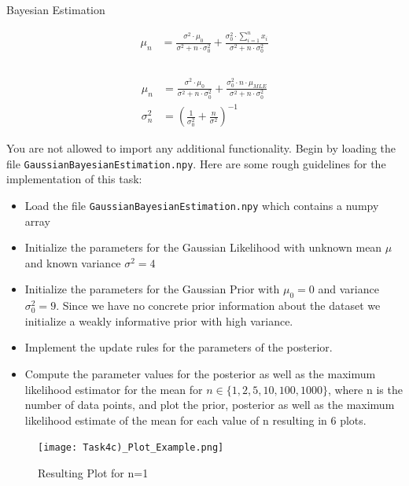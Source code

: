 \documentclass[
	english,
        solution=true
	]{tudaexercise}
\begin{document}
\begin{task}[points=16]{Bayesian Estimation}
\begin{subtask}[points=12]
    \begin{align}
        \mu_{n} &= \frac{\sigma^{2} \cdot \mu_{0}}{\sigma^{2}+n\cdot\sigma_{0}^{2}} + \frac{\sigma_{0}^{2}\cdot \sum_{i=1}^{n} x_i}{\sigma^{2}+n\cdot\sigma_{0}^{2}}\\
    \end{align}
        \\
    \begin{align}
        \mu_{n} &= \frac{\sigma^{2} \cdot \mu_{0}}{\sigma^{2}+n\cdot\sigma_{0}^{2}} + \frac{\sigma_{0}^{2}\cdot n \cdot \mu_{MLE}}{\sigma^{2}+n\cdot\sigma_{0}^{2}}\\
        \sigma_{n}^{2} &= \left(\frac{1}{\sigma_{0}^{2}} + \frac{n}{\sigma^{2}}\right)^{-1} 
    \end{align}

    You are not allowed to import any additional functionality. Begin by loading the file \texttt{GaussianBayesianEstimation.npy}. Here are some rough guidelines for the implementation of this task:
    \begin{itemize}
        \item Load the file \texttt{GaussianBayesianEstimation.npy} which contains a numpy array 
        \item Initialize the parameters for the Gaussian Likelihood with unknown mean $\mu$ and known variance $\sigma^{2}=4$  
        \item Initialize the parameters for the Gaussian Prior with $\mu_{0}=0$ and variance $\sigma_{0}^2=9$. Since we have no concrete prior information about the dataset we initialize a weakly informative prior with high variance.
        \item Implement the update rules for the parameters of the posterior.
        \item Compute the parameter values for the posterior as well as the maximum likelihood estimator for the mean for $n \in \{1, 2, 5, 10, 100, 1000\}$, where n is the number of data points, and plot the prior, posterior as well as the maximum likelihood estimate of the mean for each value of n resulting in 6 plots.
    \end{itemize}



\begin{figure}[h]
    \centering
    \texttt{[image: Task4c)\_Plot\_Example.png]}
    \caption{Resulting Plot for n=1}
    \label{fig:task4c-plot-n1}
\end{figure}


\end{subtask}
\end{task}
\end{document}
